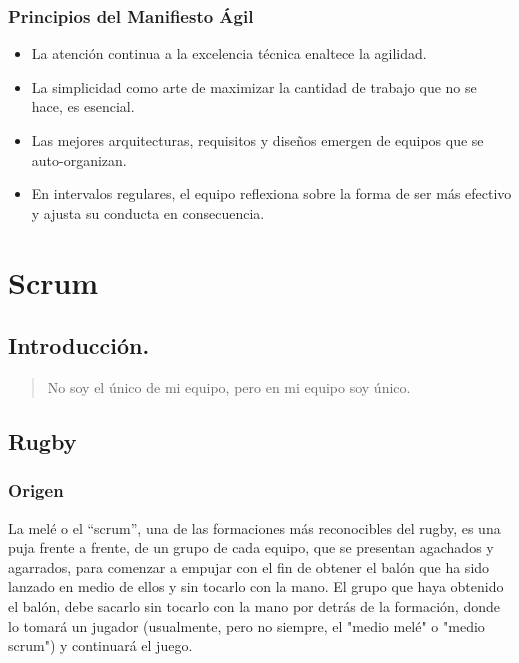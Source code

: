 \documentclass[12pt]{beamer}
\begin{document}
\begin{frame}
 \frametitle{Principios del Manifiesto Ágil}
 \begin{itemize}
  \item<2-> La atención continua a la excelencia técnica enaltece la agilidad.
  \item<3-> La simplicidad como arte de maximizar la cantidad de trabajo que no se hace, es esencial.
  \item<4-> Las mejores arquitecturas, requisitos y diseños emergen de equipos que se auto-organizan.
  \item<5-> En intervalos regulares, el equipo reflexiona sobre la forma de ser más efectivo y ajusta su conducta en consecuencia.
 \end{itemize}
\end{frame}


\section{Scrum}
\subsection{Introducción.}

\begin{frame}
 \begin{quote}
  No soy el único de mi equipo, pero en mi equipo soy único.
 \newline
 \end{quote}
\end{frame}


\subsection{Rugby}


\begin{frame}
 \frametitle{Origen}
 La melé o el ``scrum'', una de las formaciones más reconocibles del rugby, es una puja frente a frente, de un grupo de cada equipo, que se presentan agachados y agarrados, para comenzar a empujar con el fin de obtener el balón que ha sido lanzado en medio de ellos y sin tocarlo con la mano. El grupo que haya obtenido el balón, debe sacarlo sin tocarlo con la mano por detrás de la formación, donde lo tomará un jugador (usualmente, pero no siempre, el "medio melé" o "medio scrum") y continuará el juego.
\end{frame}
\end{document}
